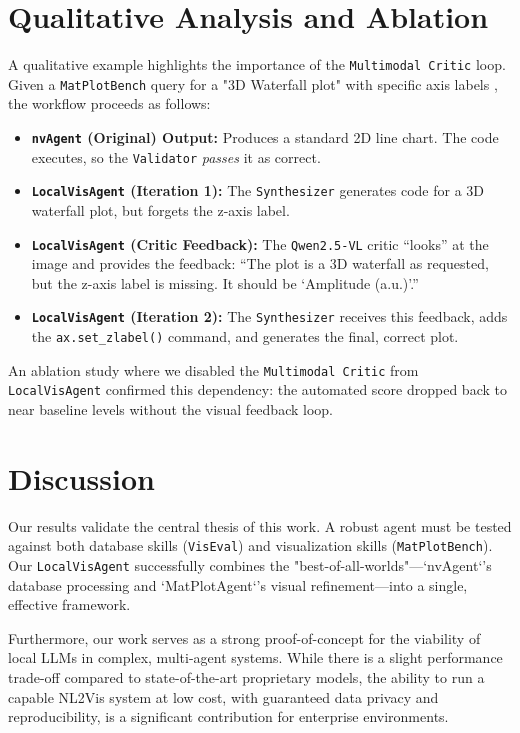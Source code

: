 \documentclass[a4paper,oneside,bibliography=totoc]{scrbook}
\begin{document}
\section{Qualitative Analysis and Ablation}
\label{sec:results_qualitative}

A qualitative example highlights the importance of the \texttt{Multimodal Critic} loop. Given a \texttt{MatPlotBench} query for a "3D Waterfall plot" with specific axis labels \cite{[15]}, the workflow proceeds as follows:

\begin{itemize}
 \item \textbf{\texttt{nvAgent} (Original) Output:} Produces a standard 2D line chart. The code executes, so the \texttt{Validator} \emph{passes} it as correct.
 \item \textbf{\texttt{LocalVisAgent} (Iteration 1):} The \texttt{Synthesizer} generates code for a 3D waterfall plot, but forgets the z-axis label.
 \item \textbf{\texttt{LocalVisAgent} (Critic Feedback):} The \texttt{Qwen2.5-VL} critic ``looks'' at the image and provides the feedback: ``The plot is a 3D waterfall as requested, but the z-axis label is missing. It should be `Amplitude (a.u.)'.''
 \item \textbf{\texttt{LocalVisAgent} (Iteration 2):} The \texttt{Synthesizer} receives this feedback, adds the \texttt{ax.set\_zlabel()} command, and generates the final, correct plot.
\end{itemize}

An ablation study where we disabled the \texttt{Multimodal Critic} from \texttt{LocalVisAgent} confirmed this dependency: the automated score dropped back to near baseline levels without the visual feedback loop.

\section{Discussion}
\label{sec:discussion}

Our results validate the central thesis of this work. A robust agent must be tested against both database skills (\texttt{VisEval}) and visualization skills (\texttt{MatPlotBench}). Our \texttt{LocalVisAgent} successfully combines the "best-of-all-worlds"---`nvAgent`'s database processing and `MatPlotAgent`'s visual refinement---into a single, effective framework.

Furthermore, our work serves as a strong proof-of-concept for the viability of local LLMs in complex, multi-agent systems. While there is a slight performance trade-off compared to state-of-the-art proprietary models, the ability to run a capable NL2Vis system at low cost, with guaranteed data privacy and reproducibility, is a significant contribution for enterprise environments.
\end{document}
